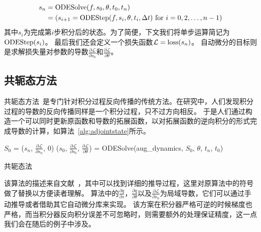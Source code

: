 \documentclass[A4,twoside,UTF8]{ctexart}
\begin{document}
\begin{align}
    \begin{split}
    s_n &= \text{ODESolve}(f, s_0, \theta, t_0, t_n)\\
        &= (s_{i+1} = {\rm ODEStep}(f, s_{i}, \theta, t_i, \Delta t) ~\text{for $i=0,2, \ldots, n-1$})
    \end{split}
\end{align}
其中$s_i$为完成第$i$步积分后的状态。为了简便，下文我们将单步运算简记为${\rm ODEStep}(s_{i})$。
最后我们还会定义一个损失函数$\mathcal{L} = {\rm loss}(s_n)$。
    自动微分的目标则是求解损失量对参数的导数$\frac{\partial \mathcal{L}}{\partial s_0}$和$\frac{\partial \mathcal{L}}{\partial \theta}$。

\subsection{共轭态方法}
    共轭态方法~\cite{Plessix2006,Chen2018}是专门针对积分过程反向传播的传统方法。在研究中，人们发现积分过程的导数的反向传播同样是一个积分过程，只不过方向相反。
    于是人们通过构造一个可以同时更新原函数和导数的拓展函数，以对拓展函数的逆向积分的形式完成导数的计算，如算法~\ref{alg:adjointstate}所示。
\begin{algorithm}
    \SetAlgoLined
    \DontPrintSemicolon
        $S_0$ = ($s_n$, $\frac{\partial \mathcal{L}}{\partial s_n}$, $0$) 
        ($s_0$, $\frac{\partial \mathcal{L}}{\partial s_0}$, $\frac{\partial \mathcal{L}}{\partial \theta}$) = ODESolve(aug\_dynamics, $S_0$, $\theta$, $t_n$, $t_0$) 
    \caption{共轭态法}\label{alg:adjointstate}
\end{algorithm}

该算法的描述来自文献~\cite{Chen2018}，其中可以找到详细的推导过程，这里对原算法中的符号做了替换以方便读者理解。
算法中的$\frac{\partial q}{\partial s}$，$\frac{\partial q}{\partial \theta}$以及$\frac{\partial \mathcal{L}}{\partial s_n}$为局域导数，它们可以通过手动推导或者借助其它自动微分库来实现。
该方案在积分器严格可逆的时候梯度也严格，而当积分器反向积分误差不可忽略时，则需要额外的处理保证精度，这一点我们会在随后的例子中涉及。
\end{document}
